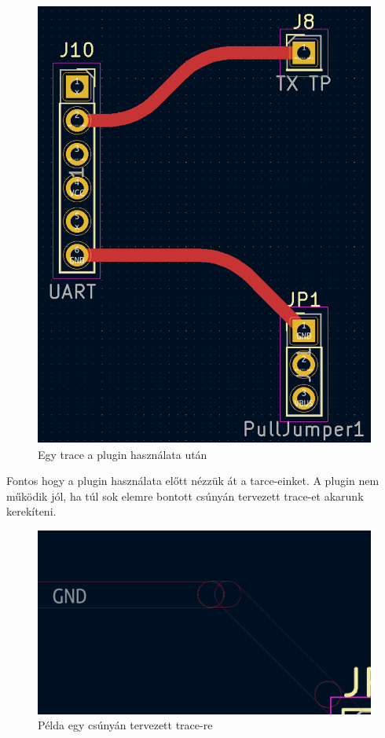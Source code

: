 \documentclass[a4paper,12pt,oneside]{book}
\begin{document}
\begin{figure}[H]
	\centering
	\includegraphics[trim=1mm 1mm 1mm 1mm,scale=0.35]{afterrounded.PNG}
	\caption{Egy trace a plugin használata után}
	\label{Egy trace a plugin használata után}
\end{figure}
Fontos hogy a plugin használata előtt nézzük át a tarce-einket. A plugin nem működik jól, ha túl sok elemre bontott csúnyán tervezett trace-et akarunk kerekíteni.
\begin{figure}[H]
	\centering
	\includegraphics[trim=1mm 1mm 1mm 1mm,scale=0.25]{rosszpelda.PNG}
	\caption{Példa egy csúnyán tervezett trace-re}
	\label{Példa egy csúnyán tervezett trace-re}
\end{figure}
\end{document}

